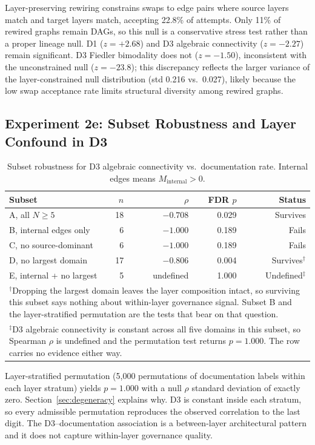 \documentclass[11pt,a4paper]{article}
\begin{document}
Layer-preserving rewiring constrains swaps to edge pairs where source
layers match and target layers match, accepting 22.8\% of attempts.
Only 11\% of rewired graphs remain DAGs, so this null is a conservative
stress test rather than a proper lineage null. D1 ($z = +2.68$) and
D3 algebraic connectivity ($z = -2.27$) remain significant. D3 Fiedler
bimodality does not ($z = -1.50$), inconsistent with the unconstrained
null ($z = -23.8$); this discrepancy reflects the larger variance of
the layer-constrained null distribution (std 0.216 vs.\ 0.027),
likely because the low swap acceptance rate limits structural diversity
among rewired graphs.

\subsection{Experiment 2e: Subset Robustness and Layer Confound in D3}

\begin{table}[htb]
\centering
\caption{Subset robustness for D3 algebraic connectivity vs.\
  documentation rate. Internal edges means $M_{\text{internal}} > 0$.}
\label{tab:subset}
\begin{tabular}{lrrrr}
\toprule
Subset & $n$ & $\rho$ & FDR $p$ & Status \\
\midrule
A, all $N \geq 5$ & 18 & $-0.708$ & 0.029 & Survives \\
B, internal edges only & 6 & $-1.000$ & 0.189 & Fails \\
C, no source-dominant & 6 & $-1.000$ & 0.189 & Fails \\
D, no largest domain & 17 & $-0.806$ & 0.004 & Survives$^\dagger$ \\
E, internal + no largest & 5 & undefined & 1.000 & Undefined$^\ddagger$ \\
\bottomrule
\multicolumn{5}{p{0.86\linewidth}}{\small $^\dagger$Dropping the largest
domain leaves the layer composition intact, so surviving this subset says
nothing about within-layer governance signal. Subset B and the
layer-stratified permutation are the tests that bear on that question.} \\
\multicolumn{5}{p{0.86\linewidth}}{\small $^\ddagger$D3 algebraic connectivity
is constant across all five domains in this subset, so Spearman $\rho$ is
undefined and the permutation test returns $p = 1.000$. The row carries no
evidence either way.}
\end{tabular}
\end{table}

Layer-stratified permutation (5,000 permutations of documentation labels
within each layer stratum) yields $p = 1.000$ with a null $\rho$
standard deviation of exactly zero. Section~\ref{sec:degeneracy}
explains why. D3 is constant inside each stratum, so every admissible
permutation reproduces the observed correlation to the last digit. The
D3--documentation association is a between-layer architectural pattern
and it does not capture within-layer governance quality.
\end{document}
